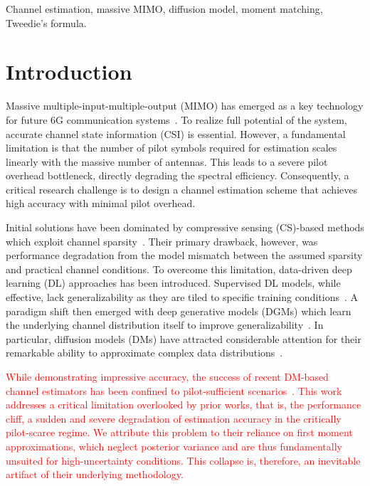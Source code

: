 \documentclass[lettersize,journal]{IEEEtran}
\newcommand{\tred}{\textcolor{red}}
\begin{document}
\begin{IEEEkeywords}
Channel estimation, massive MIMO, diffusion model, moment matching, Tweedie's formula.
\end{IEEEkeywords}


\section{Introduction}

Massive multiple-input-multiple-output (MIMO) has emerged as a key technology for future 6G communication systems~\cite{busariMillimeterWaveMassiveMIMO2018}. To realize full potential of the system, accurate channel state information (CSI) is essential. However, a fundamental limitation is that the number of pilot symbols required for estimation scales linearly with the massive number of antennas. This leads to a severe pilot overhead bottleneck, directly degrading the spectral efficiency. Consequently, a critical research challenge is to design a channel estimation scheme that achieves high accuracy with minimal pilot overhead.

Initial solutions have been dominated by compressive sensing (CS)-based methods which exploit channel sparsity~\cite{zhangAtomicNormDenoisingBased2018,mendez-rialHybridMIMOArchitectures2016,choiCompressedSensingWireless2017}. Their primary drawback, however, was performance degradation from the model mismatch between the assumed sparsity and practical channel conditions. To overcome this limitation, data-driven deep learning (DL) approaches has been introduced. Supervised DL models, while effective, lack generalizability as they are tiled to specific training conditions~\cite{heDeepLearningBasedChannel2018}. A paradigm shift then emerged with deep generative models (DGMs) which learn the underlying channel distribution itself to improve generalizability~\cite{vanhuynhGenerativeAIPhysical2024}. In particular, diffusion models (DMs) have attracted considerable attention for their remarkable ability to approximate complex data distributions~\cite{hoDenoisingDiffusionProbabilistic2020}.

\tred{
While demonstrating impressive accuracy, the success of recent DM-based channel estimators has been confined to pilot-sufficient scenarios~\cite{arvinteMIMOChannelEstimation2023,zhouGenerativeDiffusionModels2025}. This work addresses a critical limitation overlooked by prior works, that is, the performance cliff, a sudden and severe degradation of estimation accuracy in the critically pilot-scarce regime. We attribute this problem to their reliance on first moment approximations, which neglect posterior variance and are thus fundamentally unsuited for high-uncertainty conditions. This collapse is, therefore, an inevitable artifact of their underlying methodology.
}
\end{document}
